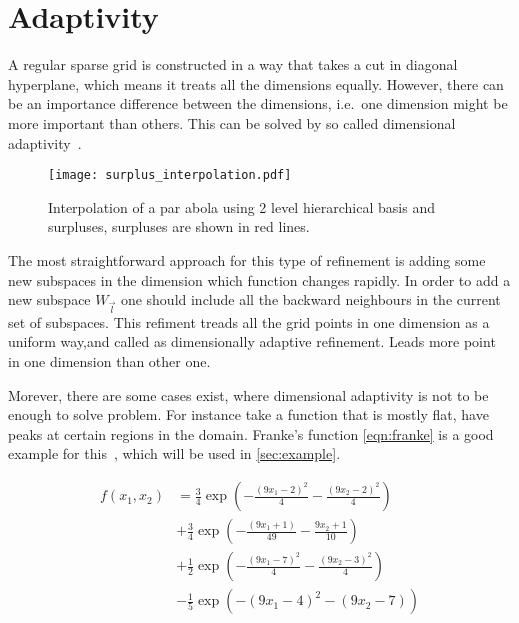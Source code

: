 \section{Adaptivity}

A regular sparse grid is constructed in a way that takes a cut in diagonal hyperplane, which means
it treats all the dimensions equally. However, there can be an importance difference between the dimensions,
i.e.~one dimension might be more important than others. This can be solved by so called dimensional adaptivity~\cite{Gerstner2003}.

\begin{figure}[bhpt]
    \centering
    \texttt{[image: surplus\_interpolation.pdf]}
    \caption{Interpolation of a par abola using 2 level hierarchical basis and surpluses, surpluses are shown in red lines.}
    \label{fig:interpolation_surplus}
\end{figure}

The most straightforward approach for this type of refinement is adding some
new subspaces in the dimension which function changes rapidly. In order to add a new subspace
\(W_{\vec{l}}\) one should include all the backward neighbours in the current set of subspaces.
This refiment treads all the grid points in one dimension as a uniform way,and called as
dimensionally adaptive refinement. Leads more point in one dimension than other one.

Morever, there are some cases exist, where dimensional adaptivity is not to be enough to solve problem.
For instance take a function that is mostly flat, have peaks at certain regions in the domain.
Franke's function \cref{eqn:franke} is a good example for this~\cite{Franke1979}, which will be used in \cref{sec:example}.

\begin{equation}
    \begin{aligned}
        f(x_1,x_2) & = \frac{3}{4} \exp \left( - \frac{(9x_1-2)^2}{4} - \frac{(9x_2-2)^2}{4} \right) \\
                   & + \frac{3}{4} \exp  \left( - \frac{(9x_1+1)}{49} - \frac{9x_2+1}{10}\right)     \\
                   & + \frac{1}{2} \exp \left( -\frac{(9x_1-7)^2}{4} - \frac{(9x_2-3)^2}{4} \right)  \\
                   & - \frac{1}{5} \exp \left( - (9x_1-4 )^2 -(9x_2-7)\right)
    \end{aligned}
    \label{eqn:franke}
\end{equation}


